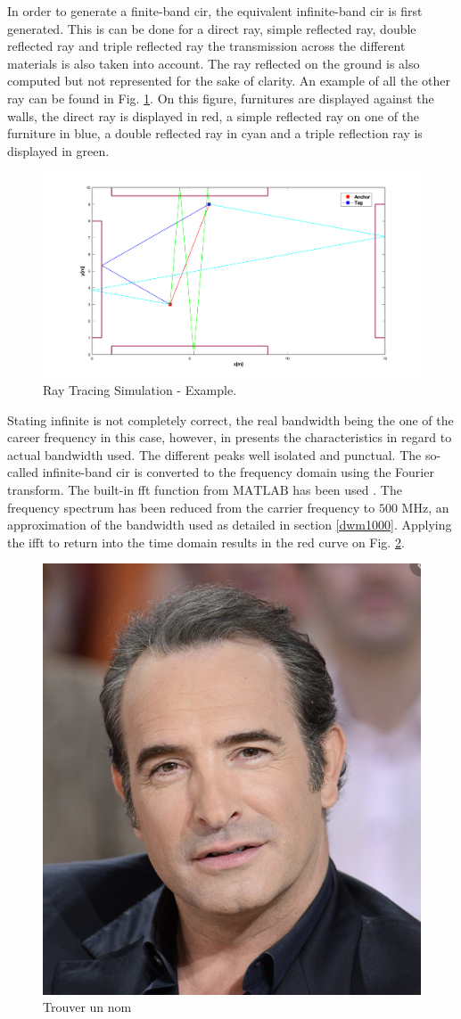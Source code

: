 In order to generate a finite-band \gls{cir}, the equivalent infinite-band \gls{cir} is first generated. This is can be done for a direct ray, simple reflected ray, double reflected ray and triple reflected ray the transmission across the different materials is also taken into account. The ray reflected on the ground is also computed but not represented for the sake of clarity. An example of all the other ray can be found in Fig. \ref{fig:ray_simu}. On this figure, furnitures are displayed against the walls, the direct ray is displayed in red, a simple reflected ray on one of the furniture in blue, a double reflected ray in cyan and a triple reflection ray is displayed in green.

\begin{figure}[H]
\centering
\includegraphics[width=.75\linewidth]{Images/rays_example.png}
\caption{Ray Tracing Simulation - Example. \label{fig:ray_simu}}
\end{figure}

Stating infinite is not completely correct, the real bandwidth being the one of the career frequency in this case, however, in presents the characteristics in regard to actual bandwidth used. The different peaks well isolated and punctual. The so-called infinite-band \gls{cir} is converted to the frequency domain using the Fourier transform. The built-in \gls{fft} function from $\text{MATLAB}$ has been used \cite{mathworks}. The frequency spectrum has been reduced from the carrier frequency to $\text{500 MHz}$, an approximation of the bandwidth used as detailed in section \ref{dwm1000}. Applying the \gls{ifft} to return into the time domain results in the red curve on Fig. \ref{fig:conv_fin}.

\begin{figure}[H]
\centering
\includegraphics[width=.2\linewidth]{Images/Temporary_pic.png}
\caption{Trouver un nom \label{fig:conv_fin}}
\end{figure}

